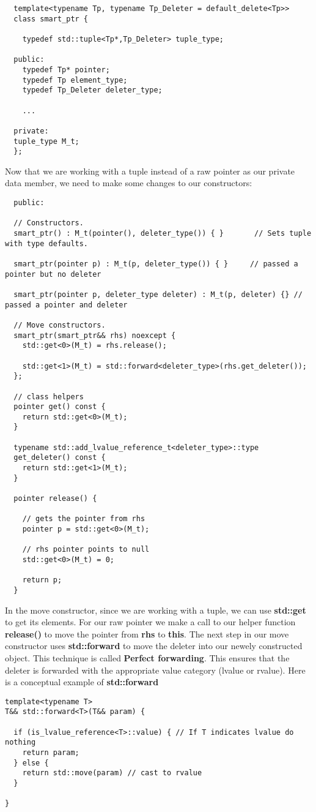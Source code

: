 \documentclass{report}
\begin{document}
\begin{verbatim}
  template<typename Tp, typename Tp_Deleter = default_delete<Tp>>
  class smart_ptr {
  
    typedef std::tuple<Tp*,Tp_Deleter> tuple_type;

  public:
    typedef Tp* pointer;
    typedef Tp element_type;
    typedef Tp_Deleter deleter_type;

    ...

  private:
  tuple_type M_t;
  };

\end{verbatim}
Now that we are working with a tuple instead of a raw pointer as our private data member, we need to make some changes to our constructors:
\begin{verbatim}
  public:
  
  // Constructors.
  smart_ptr() : M_t(pointer(), deleter_type()) { }       // Sets tuple with type defaults.

  smart_ptr(pointer p) : M_t(p, deleter_type()) { }     // passed a pointer but no deleter

  smart_ptr(pointer p, deleter_type deleter) : M_t(p, deleter) {} // passed a pointer and deleter

  // Move constructors.
  smart_ptr(smart_ptr&& rhs) noexcept {
    std::get<0>(M_t) = rhs.release();

    std::get<1>(M_t) = std::forward<deleter_type>(rhs.get_deleter());
  };

  // class helpers
  pointer get() const {
    return std::get<0>(M_t);
  }
  
  typename std::add_lvalue_reference_t<deleter_type>::type
  get_deleter() const {
    return std::get<1>(M_t);
  }

  pointer release() {

    // gets the pointer from rhs
    pointer p = std::get<0>(M_t);

    // rhs pointer points to null
    std::get<0>(M_t) = 0;
  
    return p;
  }
\end{verbatim}
In the move constructor, since we are working with a tuple, we can use \textbf{std::get} to get its elements. For our raw pointer we make a call to our helper function \textbf{release()} to move the pointer from \textbf{rhs} to \textbf{this}. The next step in our move constructor uses \textbf{std::forward} to move the deleter into our newely constructed object. This technique is called \textbf{Perfect forwarding}. This ensures that the deleter is forwarded with the appropriate value category (lvalue or rvalue). Here is a conceptual example of \textbf{std::forward}
\begin{verbatim}
template<typename T>
T&& std::forward<T>(T&& param) {

  if (is_lvalue_reference<T>::value) { // If T indicates lvalue do nothing
    return param;
  } else {
    return std::move(param) // cast to rvalue
  }
  
}
\end{verbatim}
 
\end{document}
